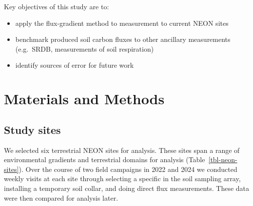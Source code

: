 \documentclass[
  letterpaper,
  DIV=11,
  numbers=noendperiod]{scrartcl}
\providecommand{\tightlist}{%
  \setlength{\itemsep}{0pt}\setlength{\parskip}{0pt}}\usepackage{longtable,booktabs,array}
\begin{document}
Key objectives of this study are to:

\begin{itemize}
\tightlist
\item
  apply the flux-gradient method to measurement to current NEON sites
\item
  benchmark produced soil carbon fluxes to other ancillary measurements
  (e.g.~SRDB, measurements of soil respiration)
\item
  identify sources of error for future work
\end{itemize}

\section{Materials and Methods}\label{materials-and-methods}

\subsection{Study sites}\label{study-sites}

We selected six terrestrial NEON sites for analysis. These sites span a
range of environmental gradients and terrestrial domains for analysis
(Table~\ref{tbl-neon-sites}). Over the course of two field campaigns in
2022 and 2024 we conducted weekly visits at each site through selecting
a specific in the soil sampling array, installing a temporary soil
collar, and doing direct flux measurements. These data were then
compared for analysis later.

\scriptsize
\end{document}
